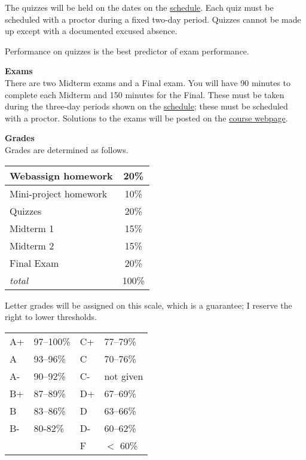 \documentclass[12pt]{article}
\renewcommand{\emph}[1]{\textsf{\textbf{#1}}}
\newcommand{\localhead}[1]{\par\smallskip\textbf{#1}\nobreak\\}%
\def\heading#1{\localhead{\large\emph{#1}}}
\def\subheading#1{\localhead{\emph{#1}}}
\begin{document}
The quizzes will be held on the dates on the \href{https://bueler.github.io/math302/schedule.pdf}{schedule}.  Each quiz must be scheduled with a proctor during a fixed two-day period.  Quizzes cannot be made up except with a documented excused absence.

Performance on quizzes is the best predictor of exam performance.

\subheading{Exams}
There are two Midterm exams and a Final exam.  You will have 90 minutes to complete each Midterm and 150 minutes for the Final.  These must be taken during the three-day periods shown on the \href{https://bueler.github.io/math302/schedule.pdf}{schedule}; these must be scheduled with a proctor.  Solutions to the exams will be posted on the \href{https://bueler.github.io/math302/}{course webpage}.


\heading{Grades}
Grades are determined as follows.
 
\begin{multicols}{2}

\begin{tabular}{|l|c|}
\hline
Webassign homework& 20\%\\
\hline
Mini-project homework & 10\% \\
\hline
Quizzes& 20\% \\
\hline
Midterm 1 & 15\% \\
\hline
Midterm 2 & 15\%  \\
\hline
Final Exam& 20\% \\
\hline
\textsl{total} & 100\%\\
\hline
\end{tabular}

\vskip 25pt

Letter grades will be assigned on this scale, which is a guarantee; I reserve the right to lower thresholds. 

\begin{tabular}{llll}
A+ & 97--100\% \quad\strut & C+ & 77--79\% \\
A & 93--96\% &  C & 70--76\% \\
A- & 90--92\% & C- & not given \\
B+ & 87--89\% & D+ & 67--69\% \\
B &  83--86\% & D & 63--66\% \\
B- & 80-82\% & D- & 60--62\% \\
 & & F  & $<$ 60\%
\end{tabular}
\end{multicols}


\vspace{-0.3in}
\end{document}

